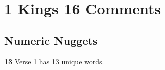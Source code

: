 \section{1 Kings 16 Comments}

\subsection{Numeric Nuggets}
\textbf{13 } Verse 1 has 13 unique words.
